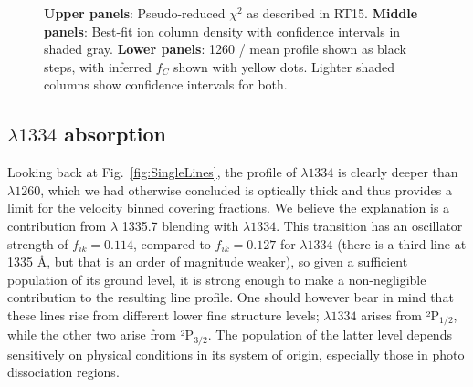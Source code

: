 \documentclass[twocolumn]{aastex61}
\begin{document}
\begin{figure}
\centering
{}
\caption{\textbf{Upper panels}: Pseudo-reduced $\chi^2$ as described in
RT15. \textbf{Middle panels}: Best-fit ion column density with
confidence intervals in shaded gray. \textbf{Lower panels}: 
1260 / mean profile shown as black steps, with inferred $f_C$
shown with yellow dots. Lighter shaded columns show confidence intervals
for both.}\label{fig:WithColDens}
\end{figure}

\subsection{ $\lambda 1334$
absorption}\label{lambda-1334-absorption}

Looking back at Fig.~\ref{fig:SingleLines}, the profile of 
$\lambda 1334$ is clearly deeper than  $\lambda 1260$, which
we had otherwise concluded is optically thick and thus provides a limit
for the velocity binned covering fractions. We believe the explanation
is a contribution from  $\lambda$ 1335.7 blending with
$\lambda 1334$. This transition has an oscillator strength of
$f_{ik} = 0.114$, compared to $f_{ik} = 0.127$ for $\lambda 1334$ (there
is a third line at 1335 Å, but that is an order of magnitude weaker), so
given a sufficient population of its ground level, it is strong enough
to make a non-negligible contribution to the resulting line profile. One
should however bear in mind that these lines rise from different lower
fine structure levels; $\lambda 1334$ arises from ²P$_{1/2}$, while the
other two arise from ²P$_{3/2}$. The population of the latter level
depends sensitively on physical conditions in its system of origin,
especially those in photo dissociation regions.
\end{document}
